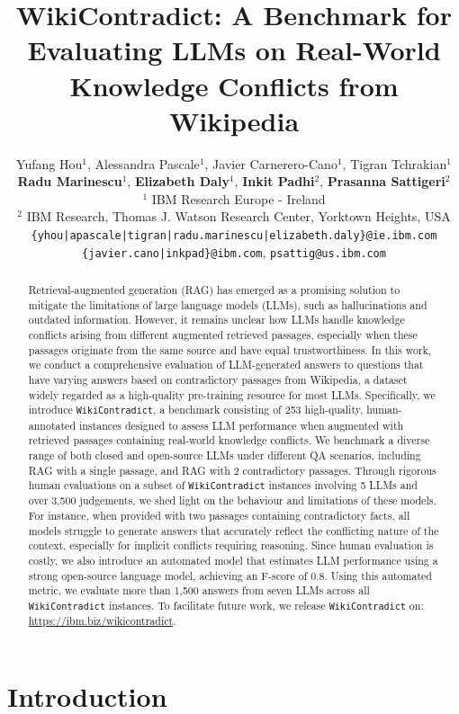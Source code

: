 \documentclass{article}
\title{WikiContradict: A Benchmark for Evaluating LLMs on Real-World Knowledge Conflicts from Wikipedia}
\author{Yufang Hou$^{1}$, Alessandra Pascale$^{1}$, Javier Carnerero-Cano$^{1}$, Tigran Tchrakian$^{1}$ \\ \textbf{Radu Marinescu}$^{1}$, \textbf{Elizabeth Daly}$^{1}$, \textbf{Inkit Padhi}$^{2}$, \textbf{Prasanna Sattigeri}$^{2}$ \\
$^{1}$ IBM Research Europe - Ireland \\
$^{2}$ IBM Research, Thomas J. Watson Research Center, Yorktown Heights, USA\\
\texttt{\{yhou|apascale|tigran|radu.marinescu|elizabeth.daly\}@ie.ibm.com}   \\
\texttt{\{javier.cano|inkpad\}@ibm.com}, \texttt{psattig@us.ibm.com} 
}
\begin{document}
\maketitle

\begin{abstract}
Retrieval-augmented generation (RAG) has emerged as a promising solution to mitigate the limitations of large language models (LLMs), such as hallucinations and outdated information. However, it remains unclear how LLMs handle knowledge conflicts arising from different augmented retrieved passages, especially when these passages originate from the same source and have equal trustworthiness. In this work, we conduct a comprehensive evaluation of LLM-generated answers to questions that have varying answers based on contradictory passages from Wikipedia, a dataset widely regarded as a high-quality pre-training resource for most LLMs. Specifically, we introduce \texttt{WikiContradict}, a benchmark consisting of 253 high-quality, human-annotated instances designed to assess LLM performance when augmented with retrieved passages containing real-world knowledge conflicts. We benchmark a diverse range of both closed and open-source LLMs under different QA scenarios, including RAG with a single  passage, and RAG with 2 contradictory passages. Through rigorous human evaluations on a subset of \texttt{WikiContradict} instances involving 5 LLMs and over 3,500 judgements, we shed light on the behaviour and limitations of these models. For instance, when provided with two passages containing contradictory facts, all models struggle to generate answers that accurately reflect the conflicting nature of the context, especially for implicit conflicts requiring reasoning. Since human evaluation is costly, we
also introduce an automated model that estimates LLM performance using a strong open-source
language model, achieving an F-score of 0.8. Using this automated metric, we evaluate more than 1,500 answers from seven LLMs across all \texttt{WikiContradict} instances.
To facilitate future work, we release \texttt{WikiContradict} on: \url{https://ibm.biz/wikicontradict}.
\end{abstract}


\section{Introduction}
\label{sec:intro}
\end{document}
